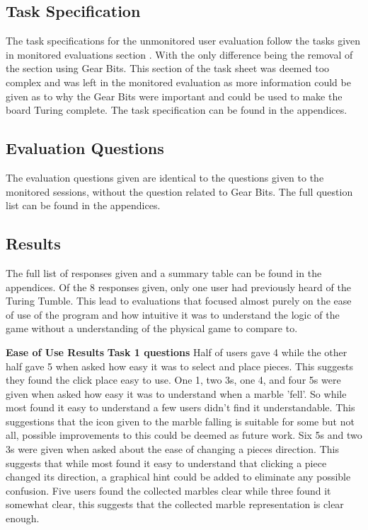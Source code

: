 \documentclass{l4proj}
\begin{document}
\subsection{Task Specification}
The task specifications for the unmonitored user evaluation follow the tasks given in monitored evaluations section . With the only difference being the removal of the section using Gear Bits. This section of the task sheet was deemed too complex and was left in the monitored evaluation as more information could be given as to why the Gear Bits were important and could be used to make the board Turing complete. The task specification can be found in the appendices.

\subsection{Evaluation Questions}
The evaluation questions given are identical to the questions given to the monitored sessions, without the question related to Gear Bits. The full question list can be found in the appendices.   

\subsection{Results}
The full list of responses given and a summary table can be found in the appendices. Of the 8 responses given, only one user had previously heard of the Turing Tumble. This lead to evaluations that focused almost purely on the ease of use of the program and how intuitive it was to understand the logic of the game without a understanding of the physical game to compare to. 

\textbf{Ease of Use Results}
\textbf{Task 1 questions}
Half of users gave 4 while the other half gave 5 when asked how easy it was to select and place pieces. This suggests they found the click place easy to use. One 1, two 3s, one 4, and four 5s were given when asked how easy it was to understand when a marble 'fell'. So while most found it easy to understand a few users didn't find it understandable. This suggestions that the icon given to the marble falling is suitable for some but not all, possible improvements to this could be deemed as future work. Six 5s and two 3s were given when asked about the ease of changing a pieces direction. This suggests that while most found it easy to understand that clicking a piece changed its direction, a graphical hint could be added to eliminate any possible confusion. Five users found the collected marbles clear while three found it somewhat clear, this suggests that the collected marble representation is clear enough.
\end{document}

